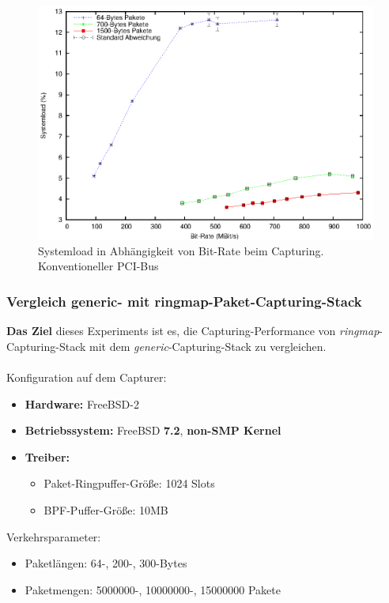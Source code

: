 {\begin{figure} 
\centering \includegraphics[width=5.5in]{plots/graphs/sysload_PCI_mbs.eps}
\caption{Systemload in Abhängigkeit von Bit-Rate beim Capturing. Konventioneller PCI-Bus}
\label{img:plot_sysload_pci_mbs}
\end{figure}
}
\subsubsection{Vergleich generic- mit ringmap-Paket-Capturing-Stack}\label{sec:erg_verg}
\textbf{Das Ziel} dieses Experiments ist es, die Capturing-Performance von 
\emph{ringmap}-Capturing-Stack mit dem \emph{generic}-Capturing-Stack
zu vergleichen.\\\\
%
Konfiguration auf dem Capturer: 
\begin{itemize}
	\item \textbf{Hardware:} FreeBSD-2 
	\item \textbf{Betriebssystem:} FreeBSD \textbf{7.2}, \textbf{non-SMP Kernel}
	\item \textbf{Treiber:} 
		\begin{itemize}
			\item Paket-Ringpuffer-Größe: 1024 Slots
			\item BPF-Puffer-Größe: 10MB
		\end{itemize}
\end{itemize}
Verkehrsparameter:
\begin{itemize}
	\item Paketlängen: 64-, 200-, 300-Bytes
	\item Paketmengen: 5000000-, 10000000-, 15000000 Pakete 
\end{itemize}

